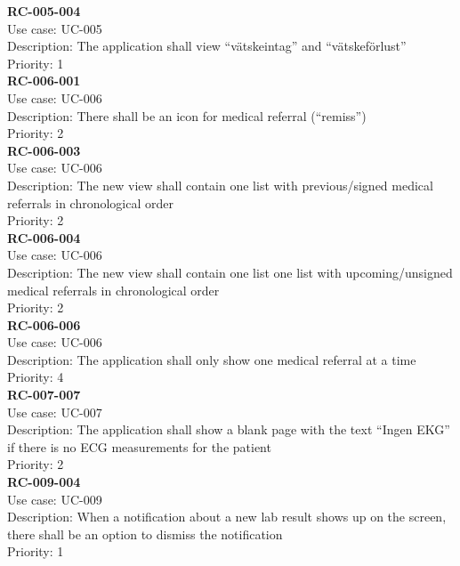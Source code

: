 \textbf{RC-005-004} \\
Use case: UC-005 \\
Description: The application shall view “vätskeintag” and “vätskeförlust” \\
Priority: 1 \\
\newline
\textbf{RC-006-001} \\
Use case: UC-006 \\
Description: There shall be an icon for medical referral (“remiss”) \\
Priority: 2 \\
\newline
\textbf{RC-006-003} \\
Use case: UC-006 \\
Description: The new view shall contain one list with previous/signed medical referrals in chronological order  \\
Priority: 2 \\
\newline
\textbf{RC-006-004} \\
Use case: UC-006 \\
Description: The new view shall contain one list one list with upcoming/unsigned medical referrals in chronological order \\
Priority: 2 \\
\newline
\textbf{RC-006-006} \\
Use case: UC-006 \\
Description: The application shall only show one medical referral at a time \\
Priority: 4 \\
\newline
\textbf{RC-007-007} \\
Use case: UC-007 \\
Description: The application shall show a blank page with the text “Ingen EKG” if there is no ECG measurements for the patient \\
Priority: 2 \\
\newline
\textbf{RC-009-004} \\
Use case: UC-009 \\
Description: When a notification about a new lab result shows up on the screen, there shall be an option to dismiss the notification \\
Priority: 1 \\
\newline
